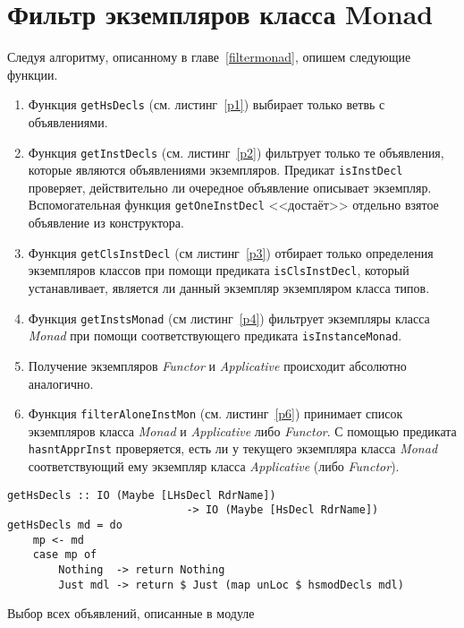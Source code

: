 \section{Фильтр экземпляров класса Monad}
Следуя алгоритму, описанному в главе~\ref{filtermonad}, опишем следующие функции.
\begin{enumerate}
\item Функция \lstinline{getHsDecls} (см. листинг~\ref{p1}) выбирает только ветвь с объявлениями.
\item Функция \lstinline{getInstDecls} (см. листинг~\ref{p2}) фильтрует только те объявления, которые являются объявлениями экземпляров. Предикат \lstinline{isInstDecl} проверяет, действительно ли очередное объявление описывает экземпляр. Вспомогательная функция \lstinline{getOneInstDecl} <<достаёт>> отдельно взятое объявление из конструктора.
\item Функция \lstinline{getClsInstDecl} (см листинг~\ref{p3}) отбирает только определения экземпляров классов при помощи предиката \lstinline{isClsInstDecl}, который устанавливает, является ли данный экземпляр экземпляром класса типов.
\item Функция \lstinline{getInstsMonad} (см листинг~\ref{p4}) фильтрует экземпляры класса \textit{Monad} при помощи соответствующего предиката \lstinline{isInstanceMonad}.
\item Получение экземпляров \textit{Functor} и \textit{Applicative} происходит абсолютно аналогично.
\item Функция \lstinline{filterAloneInstMon} (см. листинг~\ref{p6}) принимает список экземпляров класса \textit{Monad} и \textit{Applicative} либо \textit{Functor}. С помощью предиката \lstinline{hasntApprInst} проверяется, есть ли у текущего экземпляра класса \textit{Monad} соответствующий ему экземпляр класса \textit{Applicative} (либо \textit{Functor}).
\end{enumerate}

\begin{ListingEnv}[h]
\begin{lstlisting}
getHsDecls :: IO (Maybe [LHsDecl RdrName]) 
                            -> IO (Maybe [HsDecl RdrName])
getHsDecls md = do
    mp <- md
    case mp of
        Nothing  -> return Nothing
        Just mdl -> return $ Just (map unLoc $ hsmodDecls mdl)
\end{lstlisting}
\caption{Выбор всех объявлений, описанные в модуле}\label{p1}
\end{ListingEnv}


